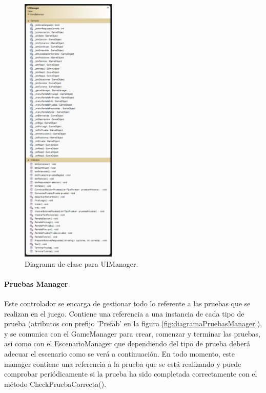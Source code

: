 \begin{figure}
	\centering
	\includegraphics[width=0.4\textwidth]{04.Desarrollo/05.Entrega5/01.Iteracion5_1/00.Figuras/13.diagrama_ui.png}
	\caption{Diagrama de clase para UIManager.}
	\label{fig:diagramaUI}
\end{figure}



\paragraph{Pruebas Manager}
Este controlador se encarga de gestionar todo lo referente a las pruebas que se realizan en el juego. Contiene una referencia a una instancia de cada tipo de prueba (atributos con prefijo 'Prefab' en la figura \ref{fig:diagramaPruebasManager}), y se comunica con el GameManager para crear, comenzar y terminar las pruebas, así como con el EscenarioManager que dependiendo del tipo de prueba deberá adecuar el escenario como se verá a continuación. En todo momento, este manager contiene una referencia a la prueba que se está realizando y puede comprobar periódicamente si la prueba ha sido completada correctamente con el método CheckPruebaCorrecta().

